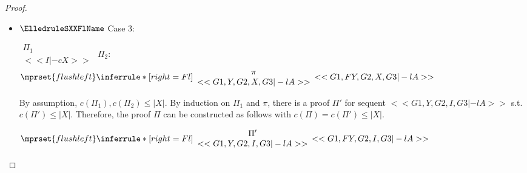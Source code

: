\begin{proof}
\begin{enumerate}
\begin{itemize}
  \item $\ElledruleSXXFlName$ Case 3:
    \begin{center}
      \scriptsize
      \begin{math}
        \begin{array}{c}
          \Pi_1 \\
          {<<I |-c X>>}
        \end{array}
      \end{math}
      \qquad\qquad
      $\Pi_2$:
      \begin{math}
        $$\mprset{flushleft}
        \inferrule* [right={\tiny Fl}] {
          {
            \begin{array}{c}
              \pi \\
              {<<G1, Y, G2, X, G3 |-l A>>}
            \end{array}
          }
        }{<<G1, F Y, G2, X, G3 |-l A>>}
      \end{math}
    \end{center}
    By assumption, $c(\Pi_1),c(\Pi_2)\leq |X|$. By induction on $\Pi_1$ and $\pi$, there is a
    proof $\Pi'$ for sequent $<<G1, Y, G2, I, G3 |-l A>>$ s.t. $c(\Pi') \leq |X|$. Therefore,
    the proof $\Pi$ can be constructed as follows with $c(\Pi) = c(\Pi') \leq |X|$.
    \begin{center}
      \scriptsize
      \begin{math}
        $$\mprset{flushleft}
        \inferrule* [right={\tiny Fl}] {
          {
            \begin{array}{c}
              \Pi' \\
              {<<G1, Y, G2, I, G3 |-l A>>}
            \end{array}
          }
        }{<<G1, F Y, G2, I, G3 |-l A>>}
      \end{math}
    \end{center}


\end{itemize}
\end{enumerate}
\end{proof}

